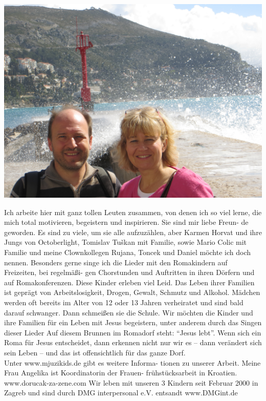 \documentclass[a4paper,twoside, svgnames]{article}
\begin{document}
\begin{multicols}{2}
\begin{onehalfspacing}
\begin{justify}
\begin{center}
\includegraphics[width=\linewidth]{images/IMG_1216}
\end{center}
Ich arbeite hier mit ganz tollen Leuten zusammen, von denen ich so viel lerne,
die mich total motivieren, begeistern und inspirieren. Sie sind mir liebe Freun-
de geworden. Es sind zu viele, um sie alle aufzuzählen, aber Karmen Horvat
und ihre Jungs von Octoberlight, Tomislav Tuškan mit Familie, sowie Mario
Colic mit Familie und
meine Clownkollegen
Rujana, Toncek und
Daniel möchte ich
doch nennen.
Besonders gerne singe
ich die Lieder mit den
Romakindern auf Freizeiten, bei regelmäßi-
gen Chorstunden und Auftritten in ihren
Dörfern und auf Romakonferenzen. Diese
Kinder erleben viel Leid. Das Leben ihrer
Familien ist geprägt von Arbeitslosigkeit,
Drogen, Gewalt, Schmutz und Alkohol.
Mädchen werden oft bereits im Alter von
12 oder 13 Jahren verheiratet und sind bald
darauf schwanger. Dann schmeißen sie die
Schule. Wir möchten die Kinder und ihre
Familien für ein Leben mit Jesus begeistern,
unter anderem durch das Singen dieser Lieder
Auf diesem Brunnen im Romadorf steht: “Jesus lebt”. Wenn sich ein Roma für Jesus entscheidet,
dann erkennen nicht nur wir es – dann verändert sich sein Leben – und das ist offensichtlich für das
ganze Dorf.\\

Unter www.mjuzikids.de gibt es weitere Informa-
tionen zu unserer Arbeit.
Meine Frau Angelika ist Koordinatorin der Frauen-
frühstücksarbeit in Kroatien.
www.dorucak-za-zene.com
Wir leben mit unseren 3 Kindern seit Februar 2000
in Zagreb und sind durch
DMG interpersonal e.V.
entsandt
www.DMGint.de


\end{justify}
\end{onehalfspacing}
\end{multicols}
\end{document}
